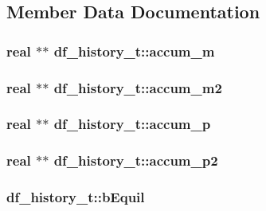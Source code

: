 \subsection{\-Member \-Data \-Documentation}
\hypertarget{structdf__history__t_a86e57854a66d0f81bdb29e9cec68eccf}{
\subsubsection[{accum\-\_\-m}]{\setlength{\rightskip}{0pt plus 5cm}real $\ast$$\ast$ {\bf df\-\_\-history\-\_\-t\-::accum\-\_\-m}}}\label{structdf__history__t_a86e57854a66d0f81bdb29e9cec68eccf}
\hypertarget{structdf__history__t_a06296d0a0581fe4688a263ae60ca585a}{
\subsubsection[{accum\-\_\-m2}]{\setlength{\rightskip}{0pt plus 5cm}real $\ast$$\ast$ {\bf df\-\_\-history\-\_\-t\-::accum\-\_\-m2}}}\label{structdf__history__t_a06296d0a0581fe4688a263ae60ca585a}
\hypertarget{structdf__history__t_ac9c1f740b756212eb5af86de87c43d6c}{
\subsubsection[{accum\-\_\-p}]{\setlength{\rightskip}{0pt plus 5cm}real $\ast$$\ast$ {\bf df\-\_\-history\-\_\-t\-::accum\-\_\-p}}}\label{structdf__history__t_ac9c1f740b756212eb5af86de87c43d6c}
\hypertarget{structdf__history__t_a3b816477f280b6b90741a7827c5d6a25}{
\subsubsection[{accum\-\_\-p2}]{\setlength{\rightskip}{0pt plus 5cm}real $\ast$$\ast$ {\bf df\-\_\-history\-\_\-t\-::accum\-\_\-p2}}}\label{structdf__history__t_a3b816477f280b6b90741a7827c5d6a25}
\hypertarget{structdf__history__t_a7b57d8cbac91cb99c569276d89bb89cf}{
\subsubsection[{b\-Equil}]{ {\bf df\-\_\-history\-\_\-t\-::b\-Equil}}}\label{structdf__history__t_a7b57d8cbac91cb99c569276d89bb89cf}

